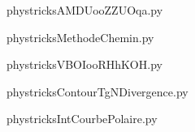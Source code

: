     

    \clearpage
    


    \newcommand{\CaptionFigAMDUooZZUOqa}{<+Type your caption here+>}
    \begin{center}
        
    \end{center}
    phystricksAMDUooZZUOqa.py

    

    \clearpage
    


    \newcommand{\CaptionFigMethodeChemin}{<+Type your caption here+>}
    \begin{center}
        
    \end{center}
    phystricksMethodeChemin.py

    

    \clearpage
    


    \newcommand{\CaptionFigVBOIooRHhKOH}{<+Type your caption here+>}
    \begin{center}
        
    \end{center}
    phystricksVBOIooRHhKOH.py

    

    \clearpage
    


    \newcommand{\CaptionFigContourTgNDivergence}{<+Type your caption here+>}
    \begin{center}
        
    \end{center}
    phystricksContourTgNDivergence.py

    

    \clearpage
    


    \newcommand{\CaptionFigIntCourbePolaire}{<+Type your caption here+>}
    \begin{center}
        
    \end{center}
    phystricksIntCourbePolaire.py

    

    \clearpage
    


